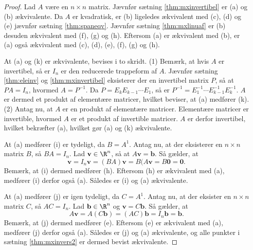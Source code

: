 \begin{proof}
Lad $A$ være en $n \times n$ matrix.
Jævnfør sætning \ref{thm:mxinvertibel} er (a) og (b) ækvivalente. 
Da $A$ er kvadratisk, er (b) ligeledes ækvivalent med (c), (d) og (e) jævnfør sætning \ref{thm:spaneqv}. 
Jævnfør sætning \ref{thm:mxlinuaf} er (b) desuden ækvivalent med (f), (g) og (h). 
Eftersom (a) er ækvivalent med (b), er (a) også ækvivalent med (c), (d), (e), (f), (g) og (h). 

At (a) og (k) er ækvivalente, bevises i to skridt. 
(1) Bemærk, at hvis $A$ er invertibel, så er $I_n$ er den reducerede trappeform af $A$. 
Jævnfør sætning \ref{thm:eleinv} og \ref{thm:mxinvertibel} eksisterer der en invertibel matrix $P$, så at $PA=I_n$, hvormed $A=P^{-1}$. 
Da $P=E_kE_{k-1} \cdots E_1$, så er $P^{-1}=E_1^{-1} \cdots E_{k-1}^{-1}E_k^{-1}$.
$A$ er dermed et produkt af elementære matricer, hvilket beviser, at (a) medfører (k). \\
(2) Antag nu, at $A$ er en produkt af elementære matricer. 
Elementære matricer er invertible, hvormed $A$ er et produkt af invertible matricer. 
$A$ er derfor invertibel, hvilket bekræfter (a), hvilket gør (a) og (k) ækvivalente. 

At (a) medfører (i) er tydeligt, da $B=A^{1}$. 
Antag nu, at der eksisterer en $n \times n$ matrix $B$, så $BA=I_n$. Lad $\textbf{v} \in \R^n$, så at $A\textbf{v}=\textbf{b}$. Så gælder, at 
$$
\textbf{v} = I_n\textbf{v} = (BA)\textbf{v} = B(A\textbf{v} = B\textbf{0} = \textbf{0}.
$$
Bemærk, at (i) dermed medfører (h).
Eftersom (h) er ækvivalent med (a), medfører (i) derfor også (a).
Således er (i) og (a) ækvivalente. 

At (a) medfører (j) er igen tydeligt, da $C=A^{1}$.
Antag nu, at der eksister en $n \times n$ matrix $C$, så $AC=I_n$. 
Lad $\textbf{b} \in \R^n$ og $\textbf{v}=C\textbf{b}$. 
Så gælder, at 
$$
A\textbf{v} = A(C\textbf{b}) = (AC)\textbf{b} = I_n\textbf{b} = \textbf{b}.
$$
Bemærk, at (j) dermed medfører (e).
Eftersom (e) er ækvivalent med (a), medfører (j) derfor også (a).
Således er (j) og (a) ækvivalente, og alle punkter i sætning \ref{thm:mxinvers2} er dermed bevist ækvivalente.
\end{proof}


